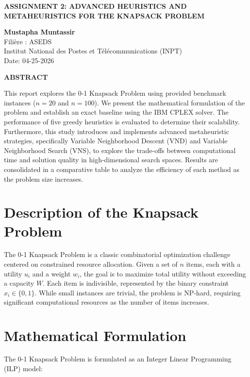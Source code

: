 \documentclass[11pt,a4paper]{article}
\begin{document}
\begin{center}
    \vspace*{1cm}
    {\large \textbf{ASSIGNMENT 2: ADVANCED HEURISTICS AND METAHEURISTICS FOR THE KNAPSACK PROBLEM}} \\
    \vspace{0.8cm}
    
    \textbf{Mustapha Muntassir} \\
    Filière : ASEDS \\
    Institut National des Postes et Télécommunications (INPT) \\
    \vspace{0.2cm}
    Date: 04-25-2026
\end{center}

\vspace{0.8cm}

\noindent \textbf{ABSTRACT}
\vspace{0.2cm}

\noindent This report explores the 0-1 Knapsack Problem using provided benchmark instances ($n=20$ and $n=100$). We present the mathematical formulation of the problem and establish an exact baseline using the IBM CPLEX solver. The performance of five greedy heuristics is evaluated to determine their scalability. Furthermore, this study introduces and implements advanced metaheuristic strategies, specifically Variable Neighborhood Descent (VND) and Variable Neighborhood Search (VNS), to explore the trade-offs between computational time and solution quality in high-dimensional search spaces. Results are consolidated in a comparative table to analyze the efficiency of each method as the problem size increases.

\vspace{0.8cm}

\section{Description of the Knapsack Problem}
The 0-1 Knapsack Problem is a classic combinatorial optimization challenge centered on constrained resource allocation. Given a set of $n$ items, each with a utility $u_i$ and a weight $w_i$, the goal is to maximize total utility without exceeding a capacity $W$. Each item is indivisible, represented by the binary constraint $x_i \in \{0, 1\}$. While small instances are trivial, the problem is NP-hard, requiring significant computational resources as the number of items increases.

\section{Mathematical Formulation}
The 0-1 Knapsack Problem is formulated as an Integer Linear Programming (ILP) model:
\end{document}
